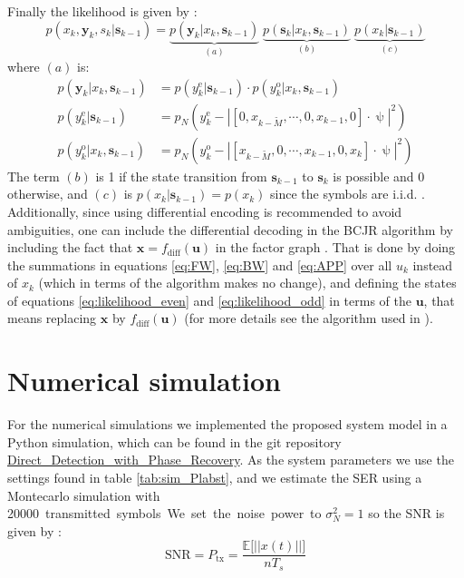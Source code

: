 Finally the likelihood is given by \cite{Plabst_DD}:
\begin{equation}
p(x_k,\bm y_k,s_k|\bm s_{k-1})=\underbrace{p(\bm y_k|x_k,\bm s_{k-1})}_{(a)}\;
\underbrace{p(\bm s_k|x_k,\bm s_{k-1})}_{(b)}\;
\underbrace{p(x_k|\bm s_{k-1})}_{(c)}
\end{equation}
where $(a)$ is:
\begin{align}
	p(\bm y_k|x_k,\bm s_{k-1})&=p(y_k^\text{e}|\bm s_{k-1})\cdot p(y_k^\text{o}|x_k,\bm s_{k-1})\\
	p(y_k^\text{e}|\bm s_{k-1})&=p_N\left(y_k^\text{e}-\left| [0,x_{k-\widetilde{M}},\cdots,0,x_{k-1},0]\cdot\uppsi\right|^2\right)
	\label{eq:likelihood_even}\\
	p(y_k^\text{o}|x_k,\bm s_{k-1})&=p_N\left(y_k^\text{o}-\left| [x_{k-\widetilde{M}},0,\cdots,x_{k-1},0,x_{k}]\cdot\uppsi\right|^2\right)
	\label{eq:likelihood_odd}
\end{align}
The term $(b)$ is 1 if the state transition from $\bm s_{k-1}$ to $\bm s_{k}$ is possible and 0 otherwise, and $(c)$ is $p(x_k|\bm s_{k-1})=p(x_k)$ since the symbols are i.i.d. \cite{Plabst_DD}.\\

Additionally, since using differential encoding is recommended to avoid ambiguities, one can include the differential decoding in the BCJR algorithm by including the fact that $\bm x=f_\text{diff}(\bm u)$ in the factor graph \cite{Plabst_DD}. That is done by doing the summations in equations \ref{eq:FW}, \ref{eq:BW} and \ref{eq:APP} over all $u_k$ instead of $x_k$ (which in terms of the algorithm makes no change), and defining the states of equations \ref{eq:likelihood_even} and \ref{eq:likelihood_odd} in terms of the $\bm u$, that means replacing $\bm x$ by $f_\text{diff}(\bm u)$ (for more details see the algorithm used in \cite{Wang}).  


\section{Numerical simulation}

For the numerical simulations we implemented the proposed system model in a Python simulation, which can be found in the git repository \href{https://github.com/dfigueroa11/Direct_Detection_with_Phase_Recovery.git}{Direct\_Detection\_with\_Phase\_Recovery}. As the system parameters we use the settings found in table \ref{tab:sim_Plabst}, and we estimate the SER using a Montecarlo simulation with \SI{20000} transmitted symbols. We set the noise power to $\sigma_N^2=1$ so the SNR is given by \cite{Plabst_DD}:
\begin{equation}
\text{SNR}=P_\text{tx}=\frac{\mathds{E}\bigl[ ||x(t)||\bigr]}{nT_s}
\end{equation}


